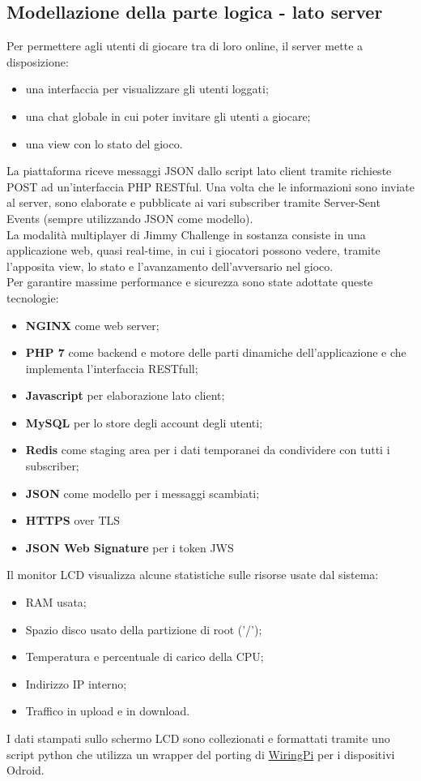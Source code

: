 \subsection{Modellazione della parte logica - lato server}
Per permettere agli utenti di giocare tra di loro online, il server mette a disposizione:
\begin{itemize}
	\item una interfaccia per visualizzare gli utenti loggati;
	\item una chat globale in cui poter invitare gli utenti a giocare;
	\item una view con lo stato del gioco.
\end{itemize}
La piattaforma riceve messaggi JSON dallo script lato client tramite richieste POST ad un'interfaccia PHP RESTful. Una volta che le informazioni sono inviate al server, sono elaborate e pubblicate ai vari subscriber tramite Server-Sent Events (sempre utilizzando JSON come modello).\\
La modalità multiplayer di Jimmy Challenge in sostanza consiste in una applicazione web, quasi real-time, in cui i giocatori possono vedere, tramite l'apposita view, lo stato e l'avanzamento dell'avversario nel gioco.\\
Per garantire massime performance e sicurezza sono state adottate queste tecnologie:
\begin{itemize}
	\item \textbf{NGINX} come web server;
	\item \textbf{PHP 7} come backend e motore delle parti dinamiche dell'applicazione e che implementa l'interfaccia RESTfull;
	\item \textbf{Javascript} per elaborazione lato client;
	\item \textbf{MySQL} per lo store degli account degli utenti;
	\item \textbf{Redis} come staging area per i dati temporanei da condividere con tutti i subscriber;
	\item \textbf{JSON} come modello per i messaggi scambiati;
	\item \textbf{HTTPS} over TLS
	\item \textbf{JSON Web Signature} per i token JWS
\end{itemize}
Il monitor LCD visualizza alcune statistiche sulle risorse usate dal sistema:
\begin{itemize}
	\item RAM usata;
	\item Spazio disco usato della partizione di root ('/');
	\item Temperatura e percentuale di carico della CPU;
	\item Indirizzo IP interno;
	\item Traffico in upload e in download.
\end{itemize}
I dati stampati sullo schermo LCD sono collezionati e formattati tramite uno script python che utilizza un wrapper del porting di \href{https://github.com/hardkernel/WiringPi2-Python}{WiringPi} per i dispositivi Odroid.

